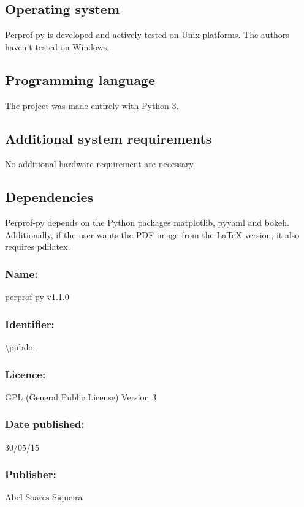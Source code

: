 \subsection*{Operating system}

    Perprof-py is developed and actively tested on Unix platforms.
    The authors haven't tested on Windows.

\subsection*{Programming language}

    The project was made entirely with Python 3.

\subsection*{Additional system requirements}

    No additional hardware requirement are necessary.

\subsection*{Dependencies}

    Perprof-py depends on the Python packages matplotlib, pyyaml and bokeh.
    Additionally, if the user wants the PDF image from the LaTeX
    version, it also requires pdflatex.

\Archive

    \subsubsection*{Name:} perprof-py v1.1.0

    \subsubsection*{Identifier:} \url{\pubdoi}

    \subsubsection*{Licence:} GPL (General Public License) Version 3

    \subsubsection*{Date published:} 30/05/15

    \subsubsection*{Publisher:} Abel Soares Siqueira

